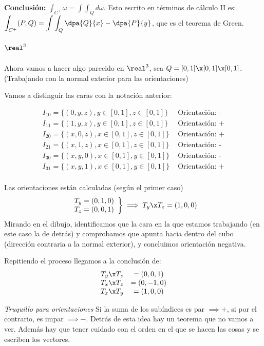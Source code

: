 \textbf{Conclusión: } $\displaystyle\int_{C^{+}} \omega = \int\int_Q d\omega$. Esto escrito en términos de cálculo II es: $\displaystyle\int_{C^{+}}(P,Q) = \int\int_Q \dpa{Q}{x} - \dpa{P}{y}$, que es el teorema de Green. 

\subparagraph{$\real^3$}
Ahora vamos a hacer algo parecido en $\real^3$, sea $Q=[0,1]\x[0,1]\x[0,1]$. (Trabajando con la normal exterior para las orientaciones)

Vamos a distinguir las caras con la notación anterior:


\[\begin{array}{cc}
I_{10} = \{(0,y,z), y\in[0,1],z\in[0,1]\} & \text{ Orientación: -} \\
I_{11} = \{(1,y,z), y\in[0,1],z\in[0,1]\} & \text{ Orientación: +} \\
I_{20} = \{(x,0,z), x\in[0,1],z\in[0,1]\} & \text{ Orientación: +} \\
I_{21} = \{(x,1,z), x\in[0,1],z\in[0,1]\} & \text{ Orientación: -} \\
I_{30} = \{(x,y,0), x\in[0,1],y\in[0,1]\} & \text{ Orientación: -} \\
I_{31} = \{(x,y,1), x\in[0,1],y\in[0,1]\} & \text{ Orientación: +} \\
\end{array}
\]

Las orientaciones están calculadas (según el primer caso) \[\left.\begin{array}{cc}
T_y = (0,1,0)\\T_z=(0,0,1)\end{array}\right\}\implies T_y\x T_z = (1,0,0)\] Mirando en el dibujo, identificamos que la cara en la que estamos trabajando (en este caso la de detrás) y comprobamos que apunta hacia dentro del cubo (dirección contraria a la normal exterior), y concluimos orientación negativa.

Repitiendo el proceso llegamos a la conclusión de: \[
\begin{array}{cc}
T_y\x T_z &= (0,0,1)\\
T_x\x T_z &= (0,-1,0)\\
T_x\x T_y &= (1,0,0)
\end{array}\]

\textit{Truquillo para orientaciones} Si la suma de los subíndices es par $\implies +$, si por el contrario, es impar $\implies -$. Detrás de esta idea hay un teorema que no vamos a ver. Además hay que tener cuidado con el orden en el que se hacen las cosas y se escriben los vectores.

